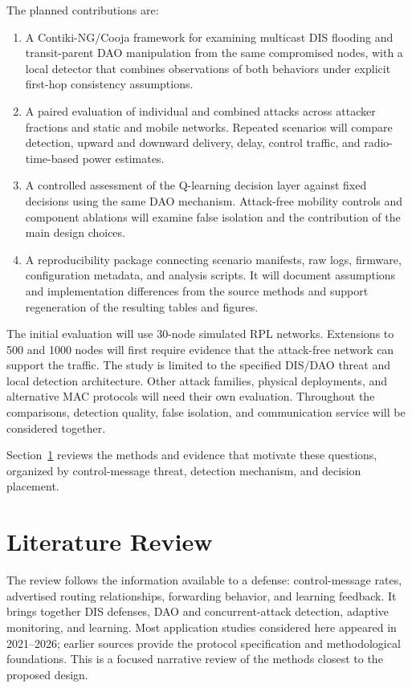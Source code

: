 \documentclass[journal]{IEEEtran}
\begin{document}
The planned contributions are:
\begin{enumerate}
\item A Contiki-NG/Cooja framework for examining multicast DIS flooding and transit-parent DAO manipulation from the same compromised nodes, with a local detector that combines observations of both behaviors under explicit first-hop consistency assumptions.
\item A paired evaluation of individual and combined attacks across attacker fractions and static and mobile networks. Repeated scenarios will compare detection, upward and downward delivery, delay, control traffic, and radio-time-based power estimates.
\item A controlled assessment of the Q-learning decision layer against fixed decisions using the same DAO mechanism. Attack-free mobility controls and component ablations will examine false isolation and the contribution of the main design choices.
\item A reproducibility package connecting scenario manifests, raw logs, firmware, configuration metadata, and analysis scripts. It will document assumptions and implementation differences from the source methods and support regeneration of the resulting tables and figures.
\end{enumerate}

The initial evaluation will use 30-node simulated RPL networks. Extensions to 500 and 1000 nodes will first require evidence that the attack-free network can support the traffic. The study is limited to the specified DIS/DAO threat and local detection architecture. Other attack families, physical deployments, and alternative MAC protocols will need their own evaluation. Throughout the comparisons, detection quality, false isolation, and communication service will be considered together.

Section~\ref{sec:related} reviews the methods and evidence that motivate these questions, organized by control-message threat, detection mechanism, and decision placement.

\section{Literature Review}\label{sec:related}
The review follows the information available to a defense: control-message rates, advertised routing relationships, forwarding behavior, and learning feedback. It brings together DIS defenses, DAO and concurrent-attack detection, adaptive monitoring, and learning. Most application studies considered here appeared in 2021--2026; earlier sources provide the protocol specification and methodological foundations. This is a focused narrative review of the methods closest to the proposed design.
\end{document}
